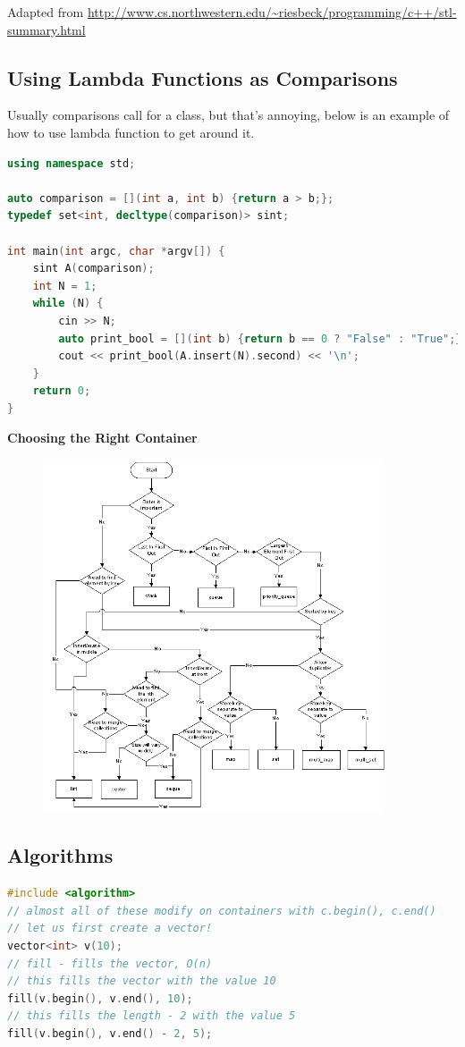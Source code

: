 \documentclass[12 pt, twoside] {article}
\begin{document}
{Adapted from \url{http://www.cs.northwestern.edu/~riesbeck/programming/c++/stl-summary.html}

\subsection*{Using Lambda Functions as Comparisons}
Usually comparisons call for a class, but that's annoying, below is an example
of how to use lambda function to get around it.
\begin{lstlisting}[language=C++]
using namespace std;

auto comparison = [](int a, int b) {return a > b;};
typedef set<int, decltype(comparison)> sint;

int main(int argc, char *argv[]) {
    sint A(comparison);
    int N = 1;
    while (N) {
        cin >> N;
        auto print_bool = [](int b) {return b == 0 ? "False" : "True";};
        cout << print_bool(A.insert(N).second) << '\n';
    }
    return 0;
}
\end{lstlisting}
\textbf{Choosing the Right Container}
\begin{figure}[h]
    \centering
    \includegraphics[width=0.9\textwidth]{containerchoice.png}
\end{figure}
\newpage
\subsection*{Algorithms}
\begin{lstlisting}[language=c++]
#include <algorithm>
// almost all of these modify on containers with c.begin(), c.end()
// let us first create a vector!
vector<int> v(10);
// fill - fills the vector, O(n)
// this fills the vector with the value 10
fill(v.begin(), v.end(), 10);
// this fills the length - 2 with the value 5
fill(v.begin(), v.end() - 2, 5);


\end{lstlisting}}
\end{document}
